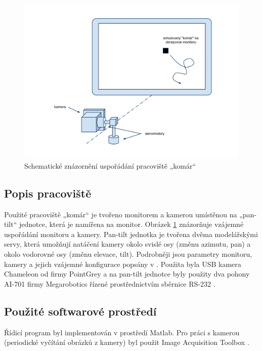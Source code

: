 \documentclass[a4paper,10pt]{article}
\begin{document}
		\begin{figure}[!h]
			\centering
			 \includegraphics[width=1\columnwidth]{pics/usporadani_pracoviste}
			 \caption{Schematické znázornění uspořádání pracoviště „komár“}\label{fig:usporadaniPracoviste}
		\end{figure}

	\subsection{Popis pracoviště}

		Použité pracoviště „komár“ je tvořeno monitorem a kamerou umístěnou na „pan-tilt“ jednotce, která je namířena
		na monitor. Obrázek \ref{fig:usporadaniPracoviste} znázorňuje vzájemné uspořádání monitoru a kamery.
		Pan-tilt jednotka je tvořena dvěma mo\-de\-lář\-ský\-mi servy, která umožňují natáčení kamery okolo svislé osy
		(změnu azimutu, pan) a okolo vodorovné osy (změnu elevace, tilt).
		Podrobněji jsou parametry monitoru, kamery a jejich vzájemné konfigurace popsány v \cite{kamera}.
		Použita byla USB kamera Chameleon od firmy PointGrey \cite{kameraDatasheet} a na pan-tilt jednotce byly
		použity dva pohony AI-701 firmy Megarobotics řízené prostřednictvím sběrnice RS-232 \cite{servaManual}.

	\subsection{Použité softwarové prostředí}

		Řídicí program byl implementován v prostředí Matlab. Pro práci s kamerou (periodické vyčítání
		obrázků z kamery) byl použit Image Acquisition Toolbox \cite{imaq}.
\end{document}

